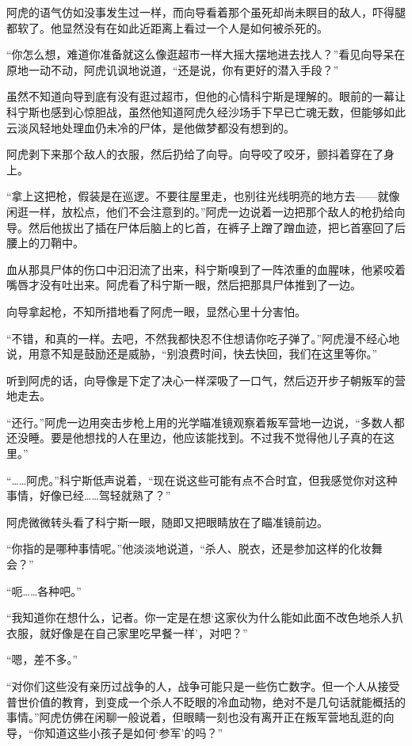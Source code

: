 阿虎的语气仿如没事发生过一样，而向导看着那个虽死却尚未瞑目的敌人，吓得腿都软了。他显然没有在如此近距离上看过一个人是如何被杀死的。

“你怎么想，难道你准备就这么像逛超市一样大摇大摆地进去找人？”看见向导呆在原地一动不动，阿虎讥讽地说道，“还是说，你有更好的潜入手段？”

虽然不知道向导到底有没有逛过超市，但他的心情科宁斯是理解的。眼前的一幕让科宁斯也感到心惊胆战，虽然他知道阿虎久经沙场手下早已亡魂无数，但能够如此云淡风轻地处理血仍未冷的尸体，是他做梦都没有想到的。

阿虎剥下来那个敌人的衣服，然后扔给了向导。向导咬了咬牙，颤抖着穿在了身上。

“拿上这把枪，假装是在巡逻。不要往屋里走，也别往光线明亮的地方去——就像闲逛一样，放松点，他们不会注意到的。”阿虎一边说着一边把那个敌人的枪扔给向导。然后他拔出了插在尸体后脑上的匕首，在裤子上蹭了蹭血迹，把匕首塞回了后腰上的刀鞘中。

血从那具尸体的伤口中汩汩流了出来，科宁斯嗅到了一阵浓重的血腥味，他紧咬着嘴唇才没有吐出来。阿虎看了科宁斯一眼，然后把那具尸体推到了一边。

向导拿起枪，不知所措地看了阿虎一眼，显然心里十分害怕。

“不错，和真的一样。去吧，不然我都快忍不住想请你吃子弹了。”阿虎漫不经心地说，用意不知是鼓励还是威胁，“别浪费时间，快去快回，我们在这里等你。”

听到阿虎的话，向导像是下定了决心一样深吸了一口气，然后迈开步子朝叛军的营地走去。

“还行。”阿虎一边用突击步枪上用的光学瞄准镜观察着叛军营地一边说，“多数人都还没睡。要是他想找的人在里边，他应该能找到。不过我不觉得他儿子真的在这里。”

“……阿虎。”科宁斯低声说着，“现在说这些可能有点不合时宜，但我感觉你对这种事情，好像已经……驾轻就熟了？”

阿虎微微转头看了科宁斯一眼，随即又把眼睛放在了瞄准镜前边。

“你指的是哪种事情呢。”他淡淡地说道，“杀人、脱衣，还是参加这样的化妆舞会？”

“呃……各种吧。”

“我知道你在想什么，记者。你一定是在想‘这家伙为什么能如此面不改色地杀人扒衣服，就好像是在自己家里吃早餐一样’，对吧？”

“嗯，差不多。”

“对你们这些没有亲历过战争的人，战争可能只是一些伤亡数字。但一个人从接受普世价值的教育，到变成一个杀人不眨眼的冷血动物，绝对不是几句话就能概括的事情。”阿虎仿佛在闲聊一般说着，但眼睛一刻也没有离开正在叛军营地乱逛的向导，“你知道这些小孩子是如何‘参军’的吗？”

